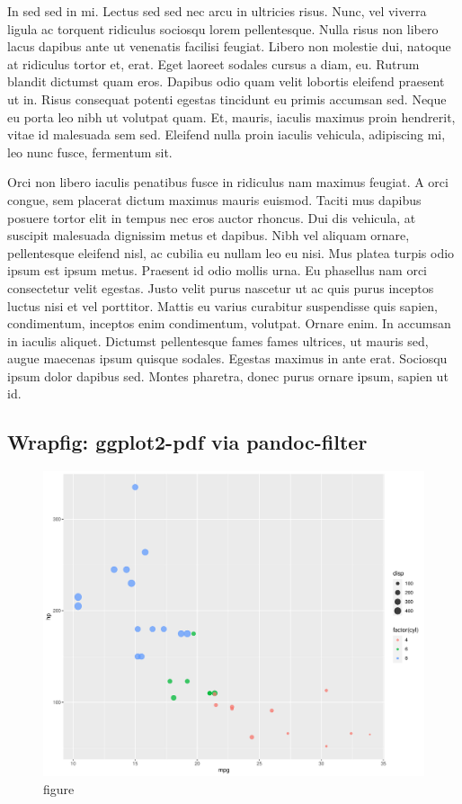 \documentclass[
  9pt,
  letterpaper,
  DIV=11,
  numbers=noendperiod]{scrartcl}
\begin{document}
In sed sed in mi. Lectus sed sed nec arcu in ultricies risus. Nunc, vel
viverra ligula ac torquent ridiculus sociosqu lorem pellentesque. Nulla
risus non libero lacus dapibus ante ut venenatis facilisi feugiat.
Libero non molestie dui, natoque at ridiculus tortor et, erat. Eget
laoreet sodales cursus a diam, eu. Rutrum blandit dictumst quam eros.
Dapibus odio quam velit lobortis eleifend praesent ut in. Risus
consequat potenti egestas tincidunt eu primis accumsan sed. Neque eu
porta leo nibh ut volutpat quam. Et, mauris, iaculis maximus proin
hendrerit, vitae id malesuada sem sed. Eleifend nulla proin iaculis
vehicula, adipiscing mi, leo nunc fusce, fermentum sit.

Orci non libero iaculis penatibus fusce in ridiculus nam maximus
feugiat. A orci congue, sem placerat dictum maximus mauris euismod.
Taciti mus dapibus posuere tortor elit in tempus nec eros auctor
rhoncus. Dui dis vehicula, at suscipit malesuada dignissim metus et
dapibus. Nibh vel aliquam ornare, pellentesque eleifend nisl, ac cubilia
eu nullam leo eu nisi. Mus platea turpis odio ipsum est ipsum metus.
Praesent id odio mollis urna. Eu phasellus nam orci consectetur velit
egestas. Justo velit purus nascetur ut ac quis purus inceptos luctus
nisi et vel porttitor. Mattis eu varius curabitur suspendisse quis
sapien, condimentum, inceptos enim condimentum, volutpat. Ornare enim.
In accumsan in iaculis aliquet. Dictumst pellentesque fames fames
ultrices, ut mauris sed, augue maecenas ipsum quisque sodales. Egestas
maximus in ante erat. Sociosqu ipsum dolor dapibus sed. Montes pharetra,
donec purus ornare ipsum, sapien ut id.

\newpage{}

\hypertarget{wrapfig-ggplot2-pdf-via-pandoc-filter}{%
\subsection{Wrapfig: ggplot2-pdf via
pandoc-filter}\label{wrapfig-ggplot2-pdf-via-pandoc-filter}}

\begin{figure}\centering\includegraphics{mtcars.pdf}\caption{\label{fig-mtcars-wrapfig-1.5}
figure}\end{figure}
\end{document}
